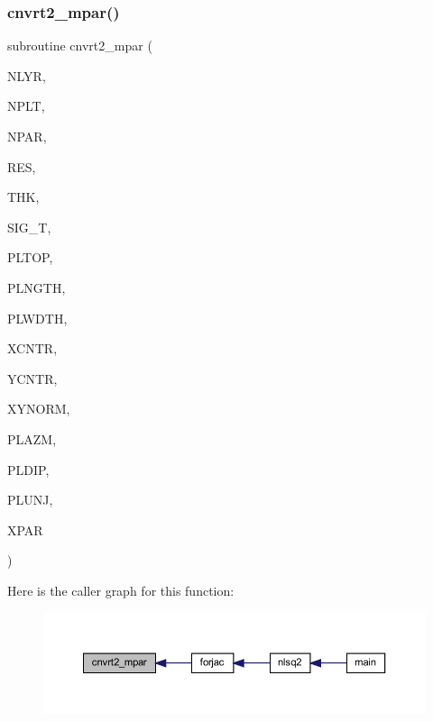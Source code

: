 \subsubsection{\texorpdfstring{cnvrt2\+\_\+mpar()}{cnvrt2\_mpar()}}
{\footnotesize\ttfamily subroutine cnvrt2\+\_\+mpar (\begin{DoxyParamCaption}\item[{integer}]{N\+L\+YR,  }\item[{integer}]{N\+P\+LT,  }\item[{integer}]{N\+P\+AR,  }\item[{real, dimension(nlyr)}]{R\+ES,  }\item[{real, dimension(nlyr)}]{T\+HK,  }\item[{real, dimension(nplt)}]{S\+I\+G\+\_\+T,  }\item[{real, dimension(nplt)}]{P\+L\+T\+OP,  }\item[{real, dimension(nplt)}]{P\+L\+N\+G\+TH,  }\item[{real, dimension(nplt)}]{P\+L\+W\+D\+TH,  }\item[{real, dimension(nplt)}]{X\+C\+N\+TR,  }\item[{real, dimension(nplt)}]{Y\+C\+N\+TR,  }\item[{real, dimension(nplt)}]{X\+Y\+N\+O\+RM,  }\item[{real, dimension(nplt)}]{P\+L\+A\+ZM,  }\item[{real, dimension(nplt)}]{P\+L\+D\+IP,  }\item[{real, dimension(nplt)}]{P\+L\+U\+NJ,  }\item[{real, dimension(npar)}]{X\+P\+AR }\end{DoxyParamCaption})}

Here is the caller graph for this function\+:\nopagebreak
\begin{figure}[H]
\begin{center}
\leavevmode
\includegraphics[width=350pt]{Leroi_8f90_a747a5bf7d69f6533bc2f54572584ba0c_icgraph}
\end{center}
\end{figure}
\mbox{\label{Leroi_8f90_aa8246fcc58fb68567634de3315aa33d2}} 
